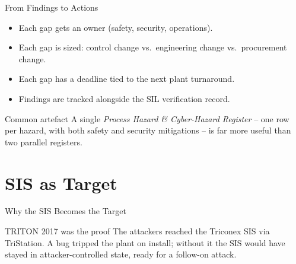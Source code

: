 \documentclass[aspectratio=169,11pt]{beamer}
\begin{document}
\begin{frame}{From Findings to Actions}
\begin{itemize}
  \item Each gap gets an owner (safety, security, operations).
  \item Each gap is sized: control change vs.\ engineering change vs.\ procurement change.
  \item Each gap has a deadline tied to the next plant turnaround.
  \item Findings are tracked alongside the SIL verification record.
\end{itemize}
\begin{tipbox}{Common artefact}
A single \emph{Process Hazard \& Cyber-Hazard Register} -- one row per hazard, with both safety and security mitigations -- is far more useful than two parallel registers.
\end{tipbox}
\end{frame}

\section{SIS as Target}

\begin{frame}{Why the SIS Becomes the Target}
\centering
{}
\vspace{1mm}
\begin{importantbox}{TRITON 2017 was the proof}
The attackers reached the Triconex SIS via TriStation. A bug tripped the plant on install; without it the SIS would have stayed in attacker-controlled state, ready for a follow-on attack.
\end{importantbox}
\end{frame}
\end{document}
